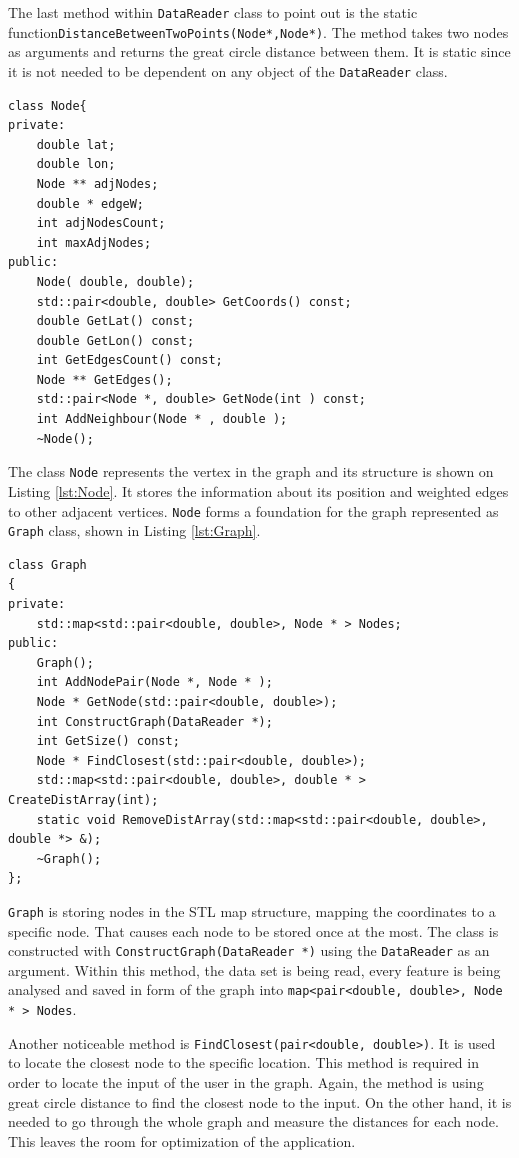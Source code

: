 \documentclass[thesis=M,english]{FITthesis}[2012/10/20]
\begin{document}
The last method within \texttt{DataReader} class to point out is the static function\texttt{DistanceBetweenTwoPoints(Node*,Node*)}. The method takes two nodes as arguments and returns the great circle distance between them. It is static since it is not needed to be dependent on any object of the \texttt{DataReader} class.

\begin{lstlisting}[frame=single, caption={\texttt{Node} class}, label={lst:Node}]
class Node{
private:
    double lat;
    double lon;
    Node ** adjNodes;
    double * edgeW;
    int adjNodesCount;
    int maxAdjNodes;
public:
    Node( double, double);
    std::pair<double, double> GetCoords() const;
    double GetLat() const;
    double GetLon() const;
    int GetEdgesCount() const;
    Node ** GetEdges();
    std::pair<Node *, double> GetNode(int ) const; 
	int AddNeighbour(Node * , double );
    ~Node();
\end{lstlisting}

The class \texttt{Node} represents the vertex in the graph and its structure is shown on Listing \ref{lst:Node}. It stores the information about its position and weighted edges to other adjacent vertices. \texttt{Node} forms a foundation for the graph represented as \texttt{Graph} class, shown in Listing \ref{lst:Graph}.

\begin{lstlisting}[frame=single, caption={\texttt{Graph} class}, label={lst:Graph}, breaklines=true]
class Graph
{
private:
    std::map<std::pair<double, double>, Node * > Nodes;
public:
    Graph();
    int AddNodePair(Node *, Node * );
    Node * GetNode(std::pair<double, double>);
    int ConstructGraph(DataReader *);
    int GetSize() const;
    Node * FindClosest(std::pair<double, double>);
    std::map<std::pair<double, double>, double * > CreateDistArray(int);
    static void RemoveDistArray(std::map<std::pair<double, double>, double *> &);
    ~Graph();
};
\end{lstlisting}

\texttt{Graph} is storing nodes in the STL map structure, mapping the coordinates to a specific node. That causes each node to be stored once at the most. The class is constructed with \texttt{ConstructGraph(DataReader *)} using the \texttt{DataReader} as an argument. Within this method, the data set is being read, every feature is being analysed and saved in form of the graph into \texttt{map<pair<double, double>, Node * > Nodes}.

Another noticeable method is \texttt{FindClosest(pair<double, double>)}. It is used to locate the closest node to the specific location. This method is required in order to locate the input of the user in the graph. Again, the method is using great circle distance to find the closest node to the input. 
On the other hand, it is needed to go through the whole graph and measure the distances for each node. 
This leaves the room for optimization of the application.
\end{document}
